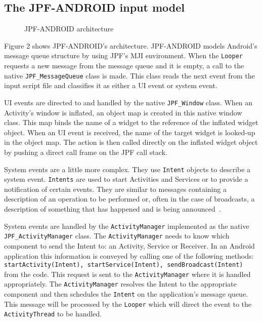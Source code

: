 \documentclass{acm_proc_article-sp}
\begin{document}
\subsection{The JPF-ANDROID input model}
\begin{figure}
\centering
{}
\caption{JPF-ANDROID architecture}
\end{figure}

Figure 2 shows JPF-ANDROID's architecture. JPF-ANDROID models Android's message queue structure by using JPF's MJI environment. When the
\texttt{Looper} requests a new message from the 
message queue and it is empty, a call to the native \texttt{JPF\_MessageQueue} class is made. This class reads the next event from the
input script file and classifies it as either a UI event or system event.

UI events are directed to and handled by the native \texttt{JPF\_Window} class. When an Activity's window is inflated, an object map
is created in this native window class. This map binds the name of a widget to the reference of the inflated widget object.
When an UI event is received, the name of the target widget is looked-up in the object map. The action is then called directly on the
inflated widget object by pushing a direct call frame on the JPF call stack. 

System events are a little more complex. They use \texttt{Intent} objects to describe a system event. \texttt{Intents} are used to start
Activities and Services or to provide a notification of certain events. They are similar to messages containing a
description of an operation to be performed or, often in the case of broadcasts, a description of something that has happened and is being
announced~\cite{AndroidDocs}. 

System events are handled by the \texttt{ActivityManager} implemented as the native \texttt{JPF\_ActivityManager} class. The
\texttt{ActivityManager} needs to know which component to send the Intent to: an Activity, Service or Receiver. In an Android
application this information is conveyed by calling one of the following methods: \texttt{startActivity(Intent), startService(Intent),
sendBroadcast(Intent)} from the code. This request is sent to the \texttt{ActivityManager} where it is 
handled appropriately. The  \texttt{ActivityManager} resolves the Intent to the appropriate component and then
schedules the \texttt{Intent} on the application's  message queue. This message will be processed by the \texttt{Looper} which will direct
the event to the \texttt{ActivityThread} to be handled.
\end{document}
